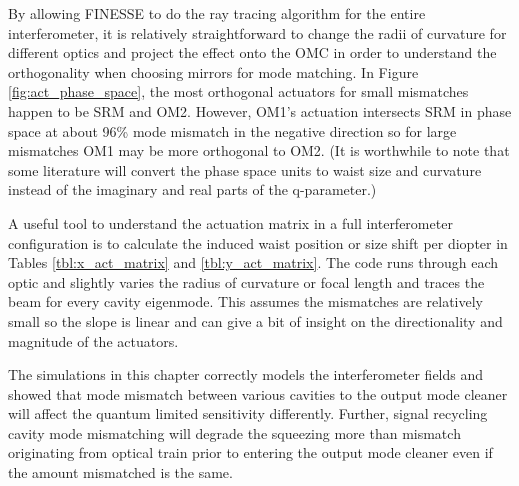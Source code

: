 	By allowing FINESSE to do the ray tracing algorithm for the entire interferometer, it is relatively straightforward to change the radii of curvature for different optics and project the effect onto the OMC in order to understand the orthogonality when choosing mirrors for mode matching.  In Figure \ref{fig:act_phase_space}, the most orthogonal actuators for small mismatches happen to be SRM and OM2. However, OM1's actuation intersects SRM in phase space at about 96\% mode mismatch in the negative direction so for large mismatches OM1 may be more orthogonal to OM2. (It is worthwhile to note that some literature will convert the phase space units to waist size and curvature instead of the imaginary and real parts of the q-parameter.)
	
	A useful tool to understand the actuation matrix in a full interferometer configuration is to calculate the induced waist position or size shift per diopter in Tables \ref{tbl:x_act_matrix} and \ref{tbl:y_act_matrix}.  The code runs through each optic and slightly varies the radius of curvature or focal length and traces the beam for every cavity eigenmode.  This assumes the mismatches are relatively small so the slope is linear and can give a bit of insight on the directionality and magnitude of the actuators.
	
	The simulations in this chapter correctly models the interferometer fields and showed that mode mismatch between various cavities to the output mode cleaner will affect the quantum limited sensitivity differently.  Further, signal recycling cavity mode mismatching will degrade the squeezing more than mismatch originating from optical train prior to entering the output mode cleaner even if the amount mismatched is the same.

